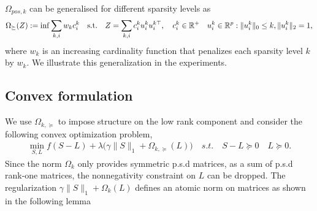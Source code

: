 $\Omega_{pos,k}$ can be generalised for different sparsity levels as
\begin{align}
\Omega_{\succeq}(Z):=\inf \sum_{k,i}w_{k}c_i^k \quad \text{s.t.} \quad Z=\sum_{k,i} c_i^k u_i^k u_{i}^{k\top}, \quad c_i^k\in \mathbb{R}^{+} \quad u_{i}^k\in\mathbb{R}^p  :   \|u_{i}^k\|_0 \leq k, \|u_{i}^k\|_2 = 1,
\end{align}
where $w_{k}$ is an increasing cardinality function that penalizes each sparsity level $k$ by $w_{k}$. We illustrate this generalization in the experiments.\\


\subsection{Convex formulation}

We use $\Omega_{k,\succeq}$ to impose structure on the low rank component and consider the following convex optimization problem,
\begin{align}
\label{opt}
\min_{S,L} f(S-L)+\lambda\big(\gamma\|S\|_{1}+\Omega_{k,\succeq}(L)\big) \quad s.t. \quad S-L \succeq 0 \quad L \succeq 0.
\end{align}
Since the norm $\Omega_k$ only provides symmetric p.s.d matrices, as a sum of p.s.d rank-one matrices, the nonnegativity constraint on $L$ can be dropped. The regularization $\gamma\|S\|_{1}+\Omega_k(L)$ defines an atomic norm on matrices as shown in the following lemma

